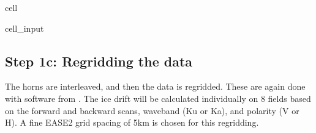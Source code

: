 \documentclass[letterpaper,10pt,english]{jupyterBook}
\begin{document}
\begin{sphinxuseclass}{cell}\begin{sphinxVerbatimInput}

\begin{sphinxuseclass}{cell_input}
\begin{sphinxVerbatim}[commandchars=\\\{\}]

  
\PYG{p}{[}\PYG{p}{]} \PYG{p}{[}\PYG{p}{]}  
\end{sphinxVerbatim}

\end{sphinxuseclass}\end{sphinxVerbatimInput}

\end{sphinxuseclass}

\subsection{Step 1c: Regridding the data}
\label{\detokenize{CIMR_L2_Sea_Ice_Drift_algorithm:step-1c-regridding-the-data}}
\sphinxAtStartPar
The horns are interleaved, and then the data is regridded. These are again done with software from . The ice drift will be calculated individually on 8 fields based on the forward and backward scans, waveband (Ku or Ka), and polarity (V or H). A fine EASE2 grid spacing of 5km is chosen for this regridding.
\end{document}
